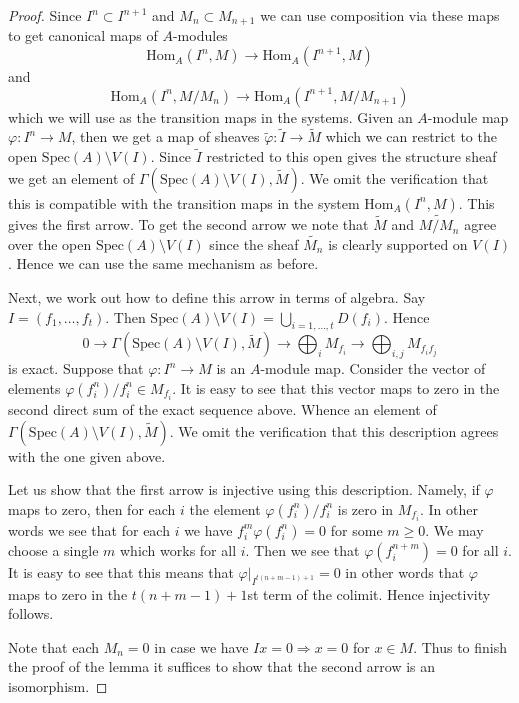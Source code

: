 \begin{proof}
Since $I^n \subset I^{n + 1}$ and $M_n \subset M_{n + 1}$ we can
use composition via these maps to get canonical maps of $A$-modules
$$
\text{Hom}_A(I^n, M)
\longrightarrow
\text{Hom}_A(I^{n + 1}, M)
$$
and
$$
\text{Hom}_A(I^n, M/M_n)
\longrightarrow
\text{Hom}_A(I^{n + 1}, M/M_{n + 1})
$$
which we will use as the transition maps in the systems. Given an
$A$-module map $\varphi : I^n \to M$, then we get a map of
sheaves $\widetilde{\varphi} : \widetilde{I} \to \widetilde{M}$
which we can restrict to the open $\text{Spec}(A) \setminus V(I)$.
Since $\widetilde{I}$ restricted to this open gives the structure
sheaf we get an element of
$\Gamma(\text{Spec}(A) \setminus V(I), \widetilde{M})$.
We omit the verification that this is compatible with the transition maps
in the system $\text{Hom}_A(I^n, M)$. This gives the first arrow.
To get the second arrow we note that
$\widetilde{M}$ and $\widetilde{M/M_n}$ agree over the open
$\text{Spec}(A) \setminus V(I)$ since the sheaf $\widetilde{M_n}$
is clearly supported on $V(I)$. Hence we can use the same mechanism
as before.

\medskip\noindent
Next, we work out how to define this arrow in terms of algebra.
Say $I = (f_1, \ldots, f_t)$. Then
$\text{Spec}(A) \setminus V(I) = \bigcup_{i = 1, \ldots, t} D(f_i)$.
Hence
$$
0 \to
\Gamma(\text{Spec}(A) \setminus V(I), \widetilde{M}) \to
\bigoplus\nolimits_i M_{f_i} \to
\bigoplus\nolimits_{i, j} M_{f_if_j}
$$
is exact. Suppose that $\varphi : I^n \to M$ is an $A$-module map.
Consider the vector of elements $\varphi(f_i^n)/f_i^n \in M_{f_i}$.
It is easy to see that this vector maps to zero in the
second direct sum of the exact sequence above. Whence an element
of $\Gamma(\text{Spec}(A) \setminus V(I), \widetilde{M})$.
We omit the verification that this description agrees with the one
given above.

\medskip\noindent
Let us show that the first arrow is injective using this description.
Namely, if $\varphi$ maps to zero, then for each $i$ the element
$\varphi(f_i^n)/f_i^n$ is zero in $M_{f_i}$. In other words we
see that for each $i$ we have $f_i^m\varphi(f_i^n) = 0$ for some $m \geq 0$.
We may choose a single $m$ which works for all $i$. Then we see that
$\varphi(f_i^{n + m}) = 0$ for all $i$. It is easy to see that
this means that $\varphi|_{I^{t(n + m - 1) + 1}} = 0$ in other
words that $\varphi$ maps to zero in the $t(n + m - 1) + 1$st
term of the colimit. Hence injectivity follows.

\medskip\noindent
Note that each $M_n = 0$ in case we have
$Ix = 0 \Rightarrow x = 0$ for $x \in M$. Thus
to finish the proof of the lemma it suffices to show that
the second arrow is an isomorphism.


\end{proof}

